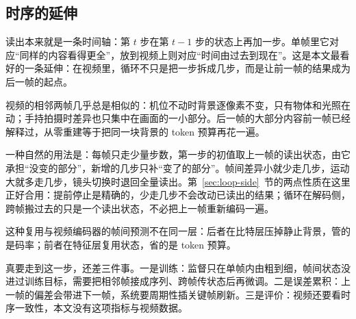 \subsection{\heiti 时序的延伸}
\label{sec:video}

读出本来就是一条时间轴：第 $t$ 步在第 $t-1$ 步的状态上再加一步。单帧里它对应“同样的内容看得更全”，放到视频上则对应“时间由过去到现在”。这是本文最看好的一条延伸：在视频里，循环不只是把一步拆成几步，而是让前一帧的结果成为后一帧的起点。

视频的相邻两帧几乎总是相似的：机位不动时背景逐像素不变，只有物体和光照在动；手持拍摄时差异也只集中在画面的一小部分。后一帧的大部分内容前一帧已经解释过，从零重建等于把同一块背景的 token 预算再花一遍。

一种自然的用法是：每帧只走少量步数，第一步的初值取上一帧的读出状态，由它承担“没变的部分”，新增的几步只补“变了的部分”。帧间差异小就少走几步，运动大就多走几步，镜头切换时退回全量读出。第~\ref{sec:loop-side}~节的两点性质在这里正好合用：提前停止是精确的，少走几步不会改动已读出的结果；循环在解码侧，跨帧搬过去的只是一个读出状态，不必把上一帧重新编码一遍。

这种复用与视频编码器的帧间预测不在同一层：后者在比特层压掉静止背景，管的是码率；前者在特征层复用状态，省的是 token 预算。

真要走到这一步，还差三件事。一是训练：监督只在单帧内由粗到细，帧间状态没进过训练目标，需要把相邻帧接成序列、跨帧传状态后再微调。二是误差累积：上一帧的偏差会带进下一帧，系统要周期性插关键帧刷新。三是评价：视频还要看时序一致性，本文没有这项指标与视频数据。
